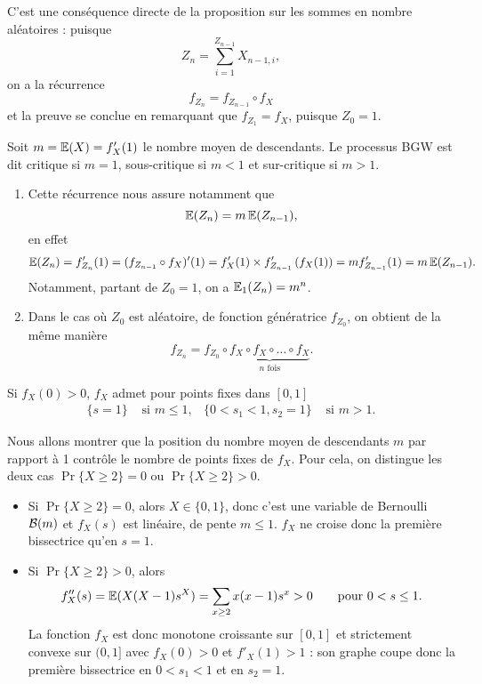 \proof 
C'est une conséquence directe de la proposition sur les sommes en nombre aléatoires : puisque
$$
Z_n = \sum_{i=1}^{Z_{n-1}} X_{n-1, i},
$$
on a la récurrence 
$$
f_{Z_n} = f_{Z_{n-1}} \circ f_X
$$
et la preuve se conclue en remarquant que $f_{Z_1} = f_X$, puisque $Z_0 = 1$.
\eproof

\begin{definition}
  Soit $m = \operatorname{\mathbb{E}}(X) = f'_X(1)$ le nombre moyen de descendants. Le processus BGW est dit critique si $m=1$, sous-critique si $m < 1$ et sur-critique si $m > 1$.
\end{definition}

\remarks
\begin{enumerate}
  \item Cette récurrence nous assure notamment que
  $$
  \operatorname{\mathbb{E}}(Z_n) = m \operatorname{\mathbb{E}}(Z_{n-1}),
  $$
  en effet
  \begin{align*}
    \operatorname{\mathbb{E}}(Z_n) 
    = f'_{Z_n}(1) = (f_{Z_{n-1}} \circ f_X)'(1) 
    = f'_X(1) \times f'_{Z_{n-1}}\left(f_X(1)\right) 
    = m f'_{Z_{n-1}}(1) = m \operatorname{\mathbb{E}}(Z_{n-1}).
  \end{align*}
  Notamment, partant de $Z_0 = 1$, on a $\operatorname{\mathbb{E}}_1(Z_n) = m^n$.
  \item Dans le cas où $Z_0$ est aléatoire, de fonction génératrice $f_{Z_0}$, on obtient de la même manière
  $$
  f_{Z_n} =  f_{Z_0} \circ \underset{n \text{ fois}}{\underbrace{f_X \circ f_X \circ \dots \circ f_X}}.
  $$
\end{enumerate}

\begin{lemma} \label{lem:BGWnombrePointsFixes}
  Si $f_X(0) > 0$, $f_X$ admet pour points fixes dans $[0, 1]$
  \begin{align*}
    \{s = 1\} & \text{ si } m \leq 1, &
    \{0 < s_1 < 1, s_2=1\} & \text{ si } m > 1.
  \end{align*}
\end{lemma}

\proof
Nous allons montrer que la position du nombre moyen de descendants $m$ par rapport à 1 contrôle le nombre de points fixes de $f_X$.
Pour cela, on distingue les deux cas $\Pr\{X\geq 2\} = 0$ ou $\Pr\{X\geq 2\} > 0$.
\begin{itemize}
  \item Si $\Pr\{X\geq 2\} = 0$, alors $X \in \{0, 1\}$, donc c'est une variable de Bernoulli $\mathcal{B}(m)$ et $f_X(s)$ est linéaire, de pente $m \leq 1$. $f_X$ ne croise donc la première bissectrice qu'en $s = 1$.
  \item Si $\Pr\{X\geq 2\} > 0$, alors
  $$
  f''_X(s) = \operatorname{\mathbb{E}}(X(X-1) s^X) = \sum_{x \geq 2} x (x-1) s^x > 0
  \qquad \text{pour } 0 < s \leq 1.
  $$
  La fonction $f_X$ est donc monotone croissante sur $[0, 1]$ et strictement convexe sur $(0, 1]$ avec $f_X(0) > 0$ et $f'_X(1) > 1$ : son graphe coupe donc la première bissectrice en   $0 < s_1 < 1$ et en $s_2=1$.
\end{itemize}
\eproof

